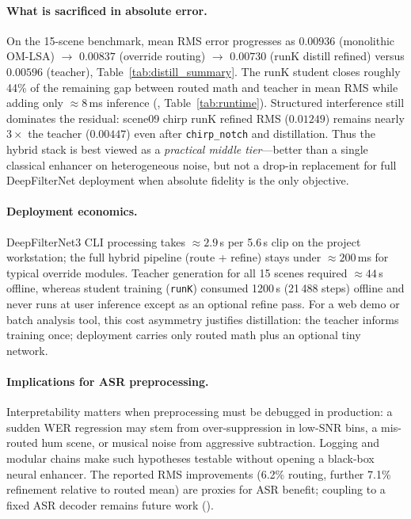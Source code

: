 \paragraph{What is sacrificed in absolute error.}
On the 15-scene benchmark, mean RMS error progresses as $0.00936$ (monolithic OM-LSA) $\to$ $0.00837$ (override routing) $\to$ $0.00730$ (runK distill refined) versus $0.00596$ (teacher), Table~\ref{tab:distill_summary}. The runK student closes roughly 44\% of the remaining gap between routed math and teacher in mean RMS while adding only $\approx 8$\,ms inference (, Table~\ref{tab:runtime}). Structured interference still dominates the residual: scene09 chirp runK refined RMS ($0.01249$) remains nearly $3\times$ the teacher ($0.00447$) even after \texttt{chirp\_notch} and distillation. Thus the hybrid stack is best viewed as a \emph{practical middle tier}---better than a single classical enhancer on heterogeneous noise, but not a drop-in replacement for full DeepFilterNet deployment when absolute fidelity is the only objective.

\paragraph{Deployment economics.}
DeepFilterNet3 CLI processing takes $\approx 2.9$\,s per 5.6\,s clip on the project workstation; the full hybrid pipeline (route + refine) stays under $\approx 200$\,ms for typical override modules. Teacher generation for all 15 scenes required $\approx 44$\,s offline, whereas student training (\texttt{runK}) consumed 1200\,s (21\,488 steps) offline and never runs at user inference except as an optional refine pass. For a web demo or batch analysis tool, this cost asymmetry justifies distillation: the teacher informs training once; deployment carries only routed math plus an optional tiny network.

\paragraph{Implications for ASR preprocessing.}
Interpretability matters when preprocessing must be debugged in production: a sudden WER regression may stem from over-suppression in low-SNR bins, a mis-routed hum scene, or musical noise from aggressive subtraction. Logging and modular chains make such hypotheses testable without opening a black-box neural enhancer. The reported RMS improvements (6.2\% routing, further 7.1\% refinement relative to routed mean) are proxies for ASR benefit; coupling to a fixed ASR decoder remains future work ().

